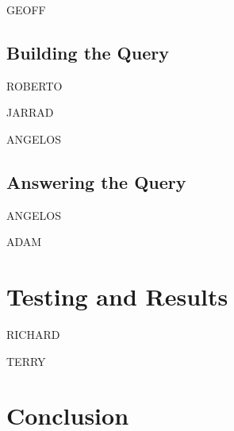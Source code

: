 \documentclass[runningheads]{llncs}
\begin{document}
GEOFF

\subsection{Building the Query}
\label{BuildingQuery}

ROBERTO

JARRAD

ANGELOS

\subsection{Answering the Query}
\label{AnsweringQuery}

ANGELOS

ADAM

\section{Testing and Results}
\label{Testing}

RICHARD

TERRY 
\section{Conclusion}
\label{Conclusion}



\end{document}
